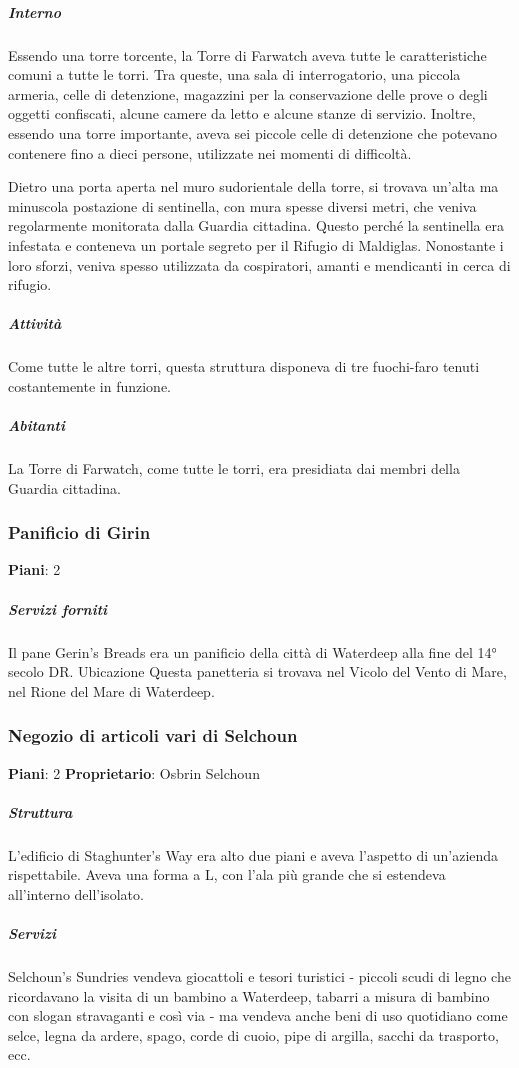 \documentclass{article}
\begin{document}
\subparagraph{Interno}
Essendo una torre torcente, la Torre di Farwatch aveva tutte le caratteristiche comuni a tutte le torri. Tra queste, una sala di interrogatorio, una piccola armeria, celle di detenzione, magazzini per la conservazione delle prove o degli oggetti confiscati, alcune camere da letto e alcune stanze di servizio. Inoltre, essendo una torre importante, aveva sei piccole celle di detenzione che potevano contenere fino a dieci persone, utilizzate nei momenti di difficoltà.

Dietro una porta aperta nel muro sudorientale della torre, si trovava un'alta ma minuscola postazione di sentinella, con mura spesse diversi metri, che veniva regolarmente monitorata dalla Guardia cittadina. Questo perché la sentinella era infestata e conteneva un portale segreto per il Rifugio di Maldiglas. Nonostante i loro sforzi, veniva spesso utilizzata da cospiratori, amanti e mendicanti in cerca di rifugio.

\subparagraph{Attività}
Come tutte le altre torri, questa struttura disponeva di tre fuochi-faro tenuti costantemente in funzione.

\subparagraph{Abitanti}
La Torre di Farwatch, come tutte le torri, era presidiata dai membri della Guardia cittadina.

\subsubsection{Panificio di Girin}
\textbf{Piani}: 2
\subparagraph{Servizi forniti}
Il pane
Gerin's Breads era un panificio della città di Waterdeep alla fine del 14° secolo DR.
Ubicazione
Questa panetteria si trovava nel Vicolo del Vento di Mare, nel Rione del Mare di Waterdeep.




\subsubsection{Negozio di articoli vari di Selchoun}
\textbf{Piani}: 2\newline
\textbf{Proprietario}: Osbrin Selchoun\newline
\subparagraph{Struttura}
L'edificio di Staghunter's Way era alto due piani e aveva l'aspetto di un'azienda rispettabile. Aveva una forma a L, con l'ala più grande che si estendeva all'interno dell'isolato.

\subparagraph{Servizi}
Selchoun's Sundries vendeva giocattoli e tesori turistici - piccoli scudi di legno che ricordavano la visita di un bambino a Waterdeep, tabarri a misura di bambino con slogan stravaganti e così via - ma vendeva anche beni di uso quotidiano come selce, legna da ardere, spago, corde di cuoio, pipe di argilla, sacchi da trasporto, ecc.
\end{document}
